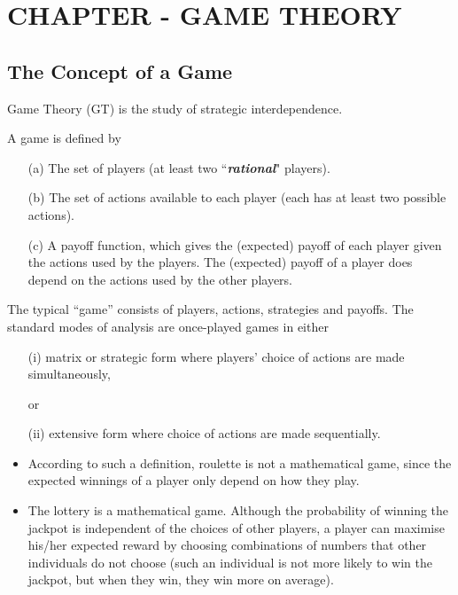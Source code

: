 \documentclass[]{report}
\begin{document}
	

\chapter{CHAPTER - GAME THEORY}
\section{The Concept of a Game}
Game Theory (GT) is the study of strategic interdependence. 
\begin{framed}
\noindent A game is defined by
\begin{itemize}
	\item[(a)] The set of players (at least two ``\textbf{\textit{rational}}" players).
	\item[(b)] The set of actions available to each player (each has at least
	two possible actions).
	\item[(c)] A payoff function, which gives the (expected) payoff of each
	player given the actions used by the players. The (expected) payoff
	of a player does depend on the actions used by the other players.
\end{itemize}
\end{framed}
\noindent The typical ``game'' consists of players, actions, strategies and payoffs. The standard modes of analysis are once-played games in either
\begin{enumerate}
	\item[(i)] matrix or strategic form where players' choice of actions are made simultaneously,
	\item[] \hspace*{50mm} or
	\item[(ii)] extensive form where choice of actions are made sequentially.
\end{enumerate}


\begin{itemize}
	\item According to such a definition, roulette is not a mathematical
	game, since the expected winnings of a player only depend on how
	they play.
	\item The lottery is a mathematical game. Although the probability of
	winning the jackpot is independent of the choices of other players,
	a player can maximise his/her expected reward by choosing
	combinations of numbers that other individuals do not choose
	(such an individual is not more likely to win the jackpot, but when
	they win, they win more on average).
\end{itemize}
\end{document}
